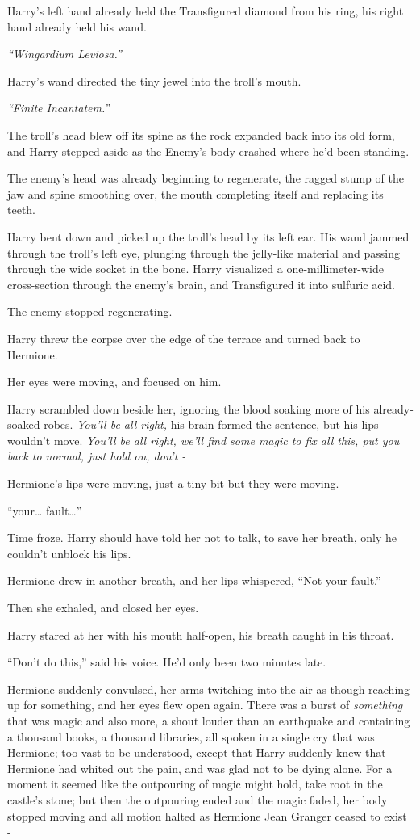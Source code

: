 Harry's left hand already held the Transfigured diamond from his ring,
his right hand already held his wand.

\emph{``Wingardium Leviosa.''}

Harry's wand directed the tiny jewel into the troll's mouth.

\emph{``Finite Incantatem.''}

The troll's head blew off its spine as the rock expanded back into its
old form, and Harry stepped aside as the Enemy's body crashed where he'd
been standing.

The enemy's head was already beginning to regenerate, the ragged stump
of the jaw and spine smoothing over, the mouth completing itself and
replacing its teeth.

Harry bent down and picked up the troll's head by its left ear. His wand
jammed through the troll's left eye, plunging through the jelly-like
material and passing through the wide socket in the bone. Harry
visualized a one-millimeter-wide cross-section through the enemy's
brain, and Transfigured it into sulfuric acid.

The enemy stopped regenerating.

Harry threw the corpse over the edge of the terrace and turned back to
Hermione.

Her eyes were moving, and focused on him.

Harry scrambled down beside her, ignoring the blood soaking more of his
already-soaked robes. \emph{You'll be all right,} his brain formed the
sentence, but his lips wouldn't move. \emph{You'll be all right, we'll
find some magic to fix all this, put you back to normal, just hold on,
don't -}

Hermione's lips were moving, just a tiny bit but they were moving.

``your\ldots{} fault\ldots{}''

Time froze. Harry should have told her not to talk, to save her breath,
only he couldn't unblock his lips.

Hermione drew in another breath, and her lips whispered, ``Not your
fault.''

Then she exhaled, and closed her eyes.

Harry stared at her with his mouth half-open, his breath caught in his
throat.

``Don't do this,'' said his voice. He'd only been two minutes late.

Hermione suddenly convulsed, her arms twitching into the air as though
reaching up for something, and her eyes flew open again. There was a
burst of \emph{something} that was magic and also more, a shout louder
than an earthquake and containing a thousand books, a thousand
libraries, all spoken in a single cry that was Hermione; too vast to be
understood, except that Harry suddenly knew that Hermione had whited out
the pain, and was glad not to be dying alone. For a moment it seemed
like the outpouring of magic might hold, take root in the castle's
stone; but then the outpouring ended and the magic faded, her body
stopped moving and all motion halted as Hermione Jean Granger ceased to
exist -

